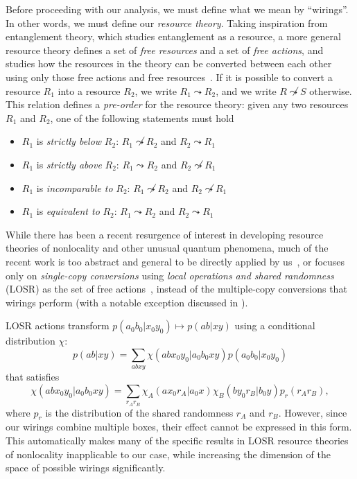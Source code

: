 \documentclass[10pt, a4paper]{article}
\numberwithin{equation}{section} %
\theoremstyle{definition}
\theoremstyle{plain}
\newcommand{\?}{\mathrel{?}} %
\begin{document}
      Before proceeding with our analysis, we must define what we mean by ``wirings''. In other words, we must define our \emph{resource theory}. Taking inspiration from entanglement theory, which studies entanglement as a resource, a more general resource theory defines a set of \emph{free resources} and a set of \emph{free actions}, and studies how the resources in the theory can be converted between each other using only those free actions and free resources~\cite{BellResourceTheory}. If it is possible to convert a resource \(R_1\) into a resource \(R_2\), we write \(R_1 \leadsto R_2\), and we write \(R \not\leadsto S\) otherwise. This relation defines a \emph{pre-order} for the resource theory: given any two resources \(R_1\) and \(R_2\), one of the following statements must hold
      \begin{itemize}
        \item \(R_1\) is \emph{strictly below} \(R_2\): \(R_1 \not\leadsto R_2\) and \(R_2 \leadsto R_1\)
        \item \(R_1\) is \emph{strictly above} \(R_2\): \(R_1 \leadsto R_2\) and \(R_2 \not\leadsto R_1\)
        \item \(R_1\) is \emph{incomparable to} \(R_2\): \(R_1 \not\leadsto R_2\) and \(R_2 \not\leadsto R_1\)
        \item \(R_1\) is \emph{equivalent to} \(R_2\): \(R_1 \leadsto R_2\) and \(R_2 \leadsto R_1\)
      \end{itemize}

      While there has been a recent resurgence of interest in developing resource theories of nonlocality and other unusual quantum phenomena, much of the recent work is too abstract and general to be directly applied by us~\cite{Monotones, TypeIndepLOSR}, or focuses only on \emph{single-copy conversions} using \emph{local operations and shared randomness} (LOSR) as the set of free actions~\cite{BellResourceTheory, TraceDistNL, NLMeas}, instead of the multiple-copy conversions that wirings perform (with a notable exception discussed in ).

      LOSR actions transform \(p(a_0 b_0|x_0 y_0) \mapsto p(ab|xy)\) using a conditional distribution \(\chi\):
      \begin{equation}
        p(ab|xy) = \sum_{abxy} \chi(abx_0y_0|a_0b_0xy) p(a_0b_0|x_0y_0)
      \end{equation}
      that satisfies
      \begin{equation}
        \chi(abx_0y_0|a_0b_0xy) = \sum_{r_A r_B} \chi_A(ax_0r_A|a_0x) \chi_B(by_0r_B|b_0y) p_r(r_A r_B),
      \end{equation}
      where \(p_r\) is the distribution of the shared randomness \(r_A\) and \(r_B\). However, since our wirings combine multiple boxes, their effect cannot be expressed in this form. This automatically makes many of the specific results in LOSR resource theories of nonlocality inapplicable to our case, while increasing the dimension of the space of possible wirings significantly.
\end{document}
